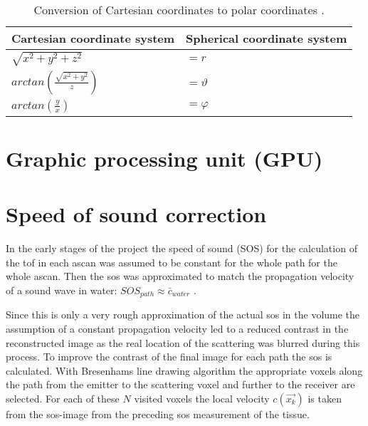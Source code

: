 \begin{table}[H]
\centering
\begin{tabular}{|ll|}
\hline
\textbf{Cartesian coordinate system} & \textbf{Spherical coordinate system}                                                                            \\ \hline
$\sqrt{x^2+y^2+z^2} $                               & $= r$ \\
$arctan( \frac{\sqrt{x^2+y^2}}{z} ) $  & $= \vartheta$ \\ 
$arctan( \frac{y}{x} ) $               & $= \varphi$                                                  \\ \hline
\end{tabular}
\caption{Conversion of Cartesian coordinates to polar coordinates \cite{Bronstein2005TaschenbuchMathematik}. }
\label{table_cart_to_Pol}
\end{table}







\section{Graphic processing unit (GPU)}












\section{Speed of sound correction}
\label{sec:sos_correct}
In the early stages of the project the speed of sound (SOS) for the calculation of the \ac{tof} in each \ac{ascan} was assumed to be constant for the whole path for the whole \ac{ascan}. Then the \ac{sos} was approximated to match the propagation velocity of a sound wave in water: $SOS_{path} \approx  \bar{c}_{water}$ \cite{Kretzek2014GPUAberration}.

Since this is only a very rough approximation of the actual \ac{sos} in the volume the assumption of a constant propagation velocity led to a reduced contrast in the reconstructed image as the real location of the scattering was blurred during this process.
To improve the contrast of the final image for each path the \ac{sos} is calculated. With Bresenhams line drawing algorithm \cite{Bresenham2010AlgorithmPlotter} the appropriate voxels along the path from the emitter to the scattering voxel and further to the receiver are selected. For each of these $N$ visited voxels the local velocity $c(\overrightarrow {x_k})$ is taken from the \ac{sos}-image from the preceding \ac{sos} measurement of the tissue.

